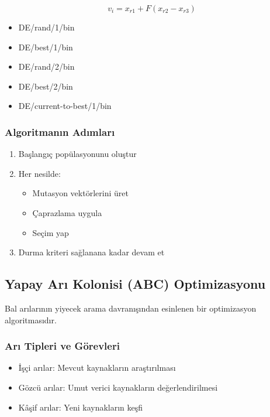 \begin{equation}
v_i = x_{r1} + F(x_{r2} - x_{r3})
\end{equation}

\begin{tcolorbox}[title=DE Stratejileri]
\begin{itemize}
    \item DE/rand/1/bin
    \item DE/best/1/bin
    \item DE/rand/2/bin
    \item DE/best/2/bin
    \item DE/current-to-best/1/bin
\end{itemize}
\end{tcolorbox}

\subsubsection{Algoritmanın Adımları}
\begin{enumerate}
    \item Başlangıç popülasyonunu oluştur
    \item Her nesilde:
        \begin{itemize}
            \item Mutasyon vektörlerini üret
            \item Çaprazlama uygula
            \item Seçim yap
        \end{itemize}
    \item Durma kriteri sağlanana kadar devam et
\end{enumerate}


\subsection{Yapay Arı Kolonisi (ABC) Optimizasyonu}
Bal arılarının yiyecek arama davranışından esinlenen bir optimizasyon algoritmasıdır.

\subsubsection{Arı Tipleri ve Görevleri}
\begin{itemize}
    \item İşçi arılar: Mevcut kaynakların araştırılması
    \item Gözcü arılar: Umut verici kaynakların değerlendirilmesi
    \item Kâşif arılar: Yeni kaynakların keşfi
\end{itemize}

